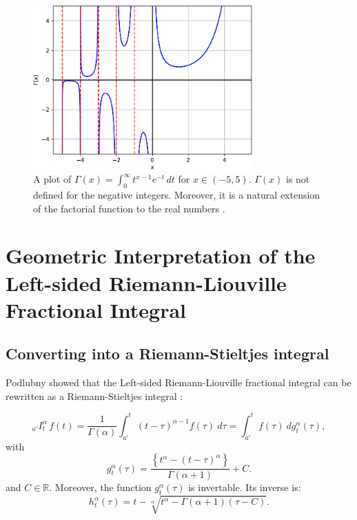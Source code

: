 \documentclass[twoside,reqno,11pt]{fcaa-var} %
\begin{document}
\begin{figure}[htb]
\centering
\includegraphics[width=0.75\textwidth]{gamma.pdf}
\caption{A plot of $\Gamma(x) = \int_0^{\infty} t^{x-1} e^{-t}\,dt$ for $x\in(-5,5)$. $\Gamma(x)$ is not defined for the negative integers. Moreover, it is a natural extension of the factorial function to the real numbers \cite{euler1738}.}
\label{fig:gamma}
\end{figure}

\section{Geometric Interpretation of the Left-sided Riemann-Liouville Fractional Integral}

\subsection{Converting into a Riemann-Stieltjes integral}
Podlubny showed that the Left-sided Riemann-Liouville fractional integral can be rewritten as a Riemann-Stieltjes integral \cite{podlubny02}:

\begin{equation}
_{a'}I_t^{\alpha}\,f(t) = \frac{1}{\Gamma(\alpha)}\int_{a'}^{t}(t-\tau)^{\alpha-1}f(\tau)~d\tau = \int_{a'}^{t} f(\tau)~dg_t^{\alpha}(\tau), 
\end{equation}
with 
\begin{equation}
\label{eq:g_rl}
g_t^{\alpha}(\tau) = \frac{\left \{t^{\alpha} - (t-\tau)^{\alpha} \right \}}{\Gamma(\alpha+1)} + C. 
\end{equation}
and $C\in\mathbb{R}$. Moreover, the function $g_t^{\alpha}(\tau)$ is invertable. Its inverse is:
\begin{equation}
h_t^{\alpha}(\tau) = t - \sqrt[\alpha]{t^{\alpha} - \Gamma(\alpha+1)(\tau-C)}.
\end{equation}
\end{document}

